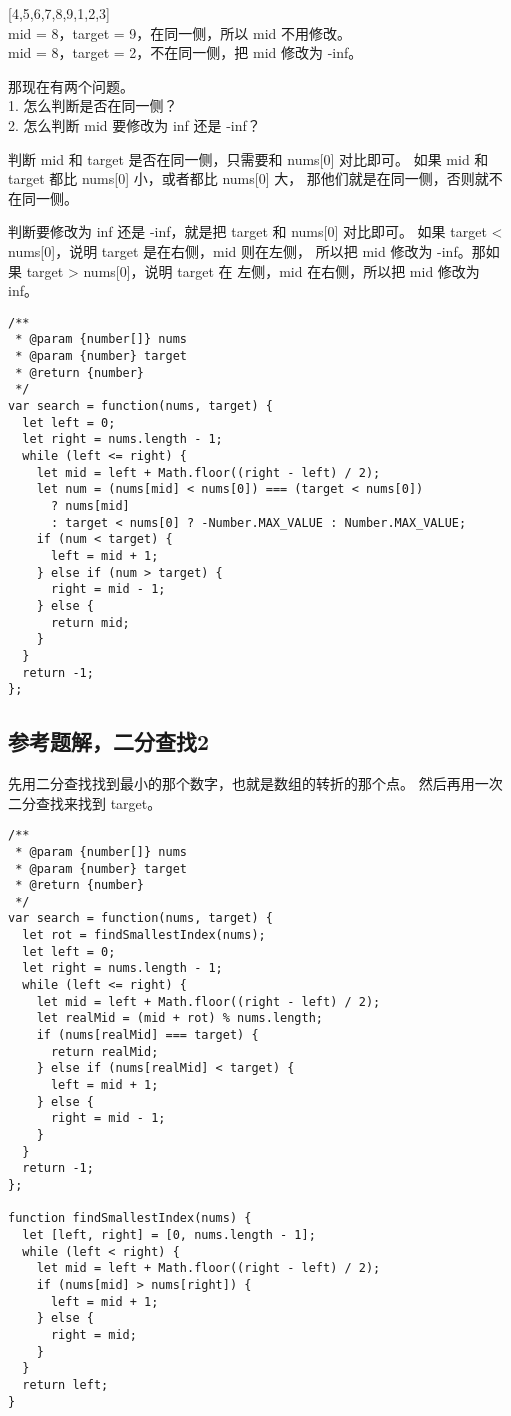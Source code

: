 [4,5,6,7,8,9,1,2,3] \\
mid = 8，target = 9，在同一侧，所以 mid 不用修改。\\
mid = 8，target = 2，不在同一侧，把 mid 修改为 -inf。

那现在有两个问题。\\
1. 怎么判断是否在同一侧？ \\
2. 怎么判断 mid 要修改为 inf 还是 -inf？

判断 mid 和 target 是否在同一侧，只需要和 nums[0] 对比即可。
如果 mid 和 target 都比 nums[0] 小，或者都比 nums[0] 大，
那他们就是在同一侧，否则就不在同一侧。

判断要修改为 inf 还是 -inf，就是把 target 和 nums[0] 对比即可。
如果 target < nums[0]，说明 target 是在右侧，mid 则在左侧，
所以把 mid 修改为 -inf。那如果 target > nums[0]，说明 target 在
左侧，mid 在右侧，所以把 mid 修改为 inf。

\begin{verbatim}
/**
 * @param {number[]} nums
 * @param {number} target
 * @return {number}
 */
var search = function(nums, target) {
  let left = 0;
  let right = nums.length - 1;
  while (left <= right) {
    let mid = left + Math.floor((right - left) / 2);
    let num = (nums[mid] < nums[0]) === (target < nums[0])
      ? nums[mid]
      : target < nums[0] ? -Number.MAX_VALUE : Number.MAX_VALUE;
    if (num < target) {
      left = mid + 1;
    } else if (num > target) {
      right = mid - 1;
    } else {
      return mid;
    }
  }
  return -1;
};
\end{verbatim}

\subsection{参考题解，二分查找2}

先用二分查找找到最小的那个数字，也就是数组的转折的那个点。
然后再用一次二分查找来找到 target。

\begin{verbatim}
/**
 * @param {number[]} nums
 * @param {number} target
 * @return {number}
 */
var search = function(nums, target) {
  let rot = findSmallestIndex(nums);
  let left = 0;
  let right = nums.length - 1;
  while (left <= right) {
    let mid = left + Math.floor((right - left) / 2);
    let realMid = (mid + rot) % nums.length;
    if (nums[realMid] === target) {
      return realMid;
    } else if (nums[realMid] < target) {
      left = mid + 1;
    } else {
      right = mid - 1;
    }
  }
  return -1;
};

function findSmallestIndex(nums) {
  let [left, right] = [0, nums.length - 1];
  while (left < right) {
    let mid = left + Math.floor((right - left) / 2);
    if (nums[mid] > nums[right]) {
      left = mid + 1;
    } else {
      right = mid;
    }
  }
  return left;
}
\end{verbatim}

